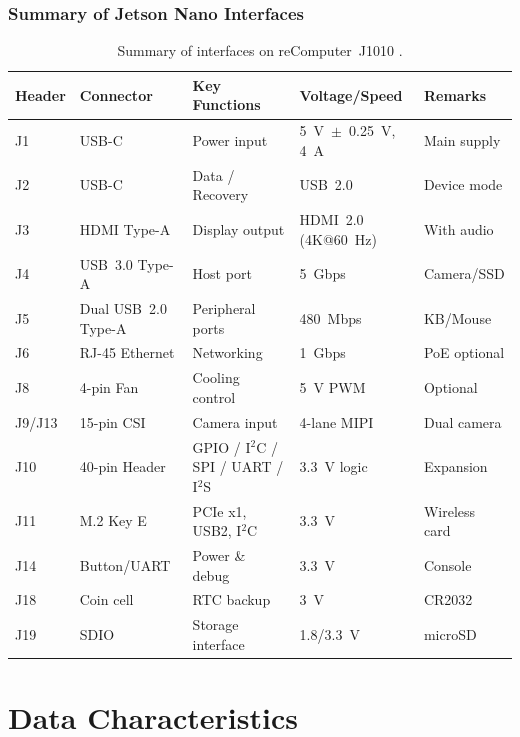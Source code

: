 \subsubsection{Summary of Jetson Nano Interfaces}
\begin{table}[H]
	\centering
	\caption{Summary of interfaces on reComputer~J1010 \cite{seeedJ101Manual}.}
	\label{tab:iface_summary}
	\begin{tabular}{|p{1.4cm}|p{3.0cm}|p{4.2cm}|p{2.7cm}|p{3.0cm}|}
		\hline
		\textbf{Header} & \textbf{Connector} & \textbf{Key Functions} & \textbf{Voltage/Speed} & \textbf{Remarks} \\
		\hline
		J1 & \ac{USB}-C & Power input & 5~V~$\pm$~0.25~V, 4~A & Main supply \\
		J2 & \ac{USB}-C & Data / Recovery & \ac{USB}~2.0 & Device mode \\
		J3 & \ac{HDMI} Type-A & Display output & \ac{HDMI}~2.0 (4K@60~Hz) & With audio \\
		J4 & \ac{USB}~3.0 Type-A & Host port & 5~Gbps & Camera/SSD \\
		J5 & Dual \ac{USB}~2.0 Type-A & Peripheral ports & 480~Mbps & KB/Mouse \\
		J6 & RJ-45 Ethernet & Networking & 1~Gbps & PoE optional \\
		J8 & 4-pin Fan & Cooling control & 5~V \ac{PWM} & Optional \\
		J9/J13 & 15-pin \ac{CSI} & Camera input & 4-lane MIPI & Dual camera \\
		J10 & 40-pin Header & GPIO / I$^2$C / SPI / \ac{UART} / I$^2$S & 3.3~V logic & Expansion \\
		J11 & M.2 Key E & PCIe x1, \ac{USB}2, I$^2$C & 3.3~V & Wireless card \\
		J14 & Button/\ac{UART} & Power \& debug & 3.3~V & Console \\
		J18 & Coin cell & RTC backup & 3~V & CR2032 \\
		J19 & SDIO & Storage interface & 1.8/3.3~V & microSD \\
		\hline
	\end{tabular}
\end{table}


\newpage
\section{Data Characteristics}
\label{sec:jetson_data}

